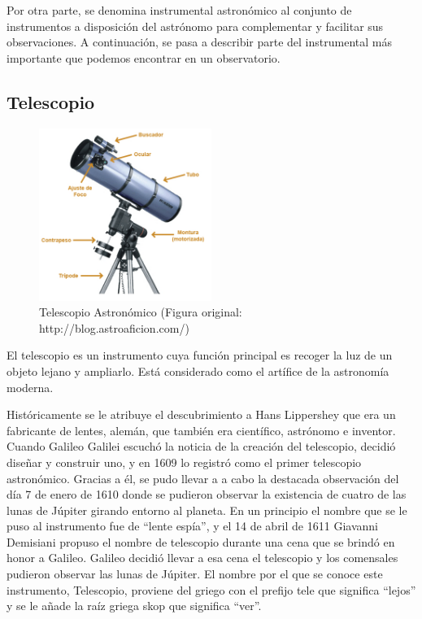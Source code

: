 Por otra parte, se denomina instrumental astronómico al conjunto de instrumentos a disposición del astrónomo para complementar y facilitar sus observaciones.
A continuación, se pasa a describir parte del instrumental más importante que podemos encontrar en un observatorio.


\subsection{Telescopio}
\begin{figure}[htb]
\centering
\includegraphics[width=0.5\textwidth]{./imagenes/telescopio}
\caption{Telescopio Astronómico  (Figura original: http://blog.astroaficion.com/)} \label{fig:telescopio}
\end{figure}

El telescopio es un instrumento cuya función principal es recoger la luz de un objeto lejano y ampliarlo. Está considerado como el artífice de la astronomía moderna.

Históricamente se le atribuye el descubrimiento a Hans Lippershey que era un fabricante de lentes, alemán, que también era científico, astrónomo e inventor.
Cuando Galileo Galilei escuchó la noticia de la creación del telescopio, decidió diseñar y construir uno, y en 1609 lo registró como el primer telescopio astronómico. Gracias a él, se pudo llevar a a cabo la destacada observación del día 7 de enero de 1610 donde se pudieron observar la existencia de cuatro de las lunas de Júpiter girando entorno al planeta.
En un principio el nombre que se le puso al instrumento fue de “lente espía”, y el 14 de abril de 1611 Giavanni Demisiani propuso el nombre de telescopio durante una cena que se brindó en honor a Galileo. Galileo decidió llevar a esa cena el telescopio y los comensales pudieron observar las lunas de Júpiter. El nombre por el que se conoce este instrumento, Telescopio, proviene del griego con el prefijo tele que significa “lejos” y se le añade la raíz griega skop que significa “ver”.

